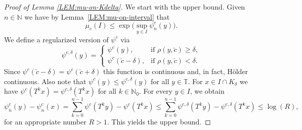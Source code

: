 \documentclass[11pt,reqno]{amsart}
\theoremstyle{plain}
\theoremstyle{definition}
\newcommand{\N}{{\mathbb N}}
\newcommand{\TT}{\mathbb{T}}
\begin{document}
\begin{proof}[Proof of Lemma \ref{LEM:mu-on-Kdelta}]
We start with the upper bound. Given $n \in \N$ we have by Lemma~\ref{LEM:mu-on-interval} that
\[
\mu_c(I) \leqslant \exp \Big( \sup_{y \in I} \psi_n^c(y) \Big).
\]
We define a regularized version of $\psi^{c}$ via
\[
\psi^{c,\delta} (y)
= \begin{cases}
\psi^c(y), & \mbox{if } \rho(y,\breve{c}) \geqslant \delta,
\\ \psi^c(\breve{c} - \delta), & \mbox{if } \rho(y,\breve{c}) < \delta.
\end{cases}
\]
Since $\psi^c(\breve{c}-\delta) = \psi^c(\breve{c} + \delta)$ this function is continuous and, in fact, H\"{o}lder continuous. Also note that $\psi^c(y) \leqslant \psi^{c,\delta}(y)$ for all $y \in \TT$.
For $x \in I \cap K_\delta$ we have $\psi^c(T^k x) = \psi^{c,\delta}(T^k x)$ for all $k \in \N_0$. For every $y \in I$, we obtain
\[
\psi^c_n(y) - \psi^c_n(x) = \sum_{k=0}^{n-1} \psi^c(T^k y) - \psi^c(T^k x)
\leqslant \sum_{k=0}^{n-1} \psi^{c,\delta}(T^k y) - \psi^{c,\delta}(T^k x) \leqslant \log(R),
\]
for an appropriate number $R>1$. This yields the upper bound.



\end{proof}
\end{document}

